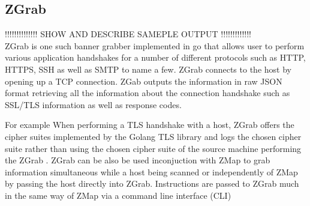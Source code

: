 \documentclass[a4wide,leqno,12pt]{report}
\begin{document}
\subsection{ZGrab}
!!!!!!!!!!!!!! SHOW AND DESCRIBE SAMEPLE OUTPUT !!!!!!!!!!!!!\\

ZGrab is one such banner grabber implemented in go that allows user to perform various application handshakes for a number of different protocols such as HTTP, HTTPS, SSH as well as SMTP to name a few. ZGrab connects to the host by opening up a TCP connection. ZGab outputs the information in raw JSON format retrieving all the information about the connection handshake such as SSL/TLS information as well as response codes.\cite{durumeric2015search}

For example When performing a TLS handshake with a host, ZGrab offers the cipher suites implemented by the Golang TLS library and logs the chosen cipher suite\cite{durumeric2015search} rather than using the chosen cipher suite of the source machine performing the ZGrab . ZGrab can be also be used inconjuction with ZMap to grab information simultaneous while a host being scanned or independently of ZMap by passing the host directly into ZGrab. Instructions are passed to ZGrab much in the same way of ZMap via a command line interface (CLI)
\end{document}
